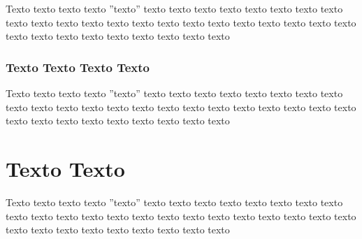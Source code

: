 Texto texto texto texto ''texto'' texto texto texto texto texto texto texto texto texto texto texto texto texto texto texto texto texto texto texto texto texto texto texto texto texto texto texto texto texto texto texto

\subsubsection{Texto Texto Texto Texto}
\label{subsub:outrasubsubsection2a}

Texto texto texto texto ''texto'' texto texto texto texto texto texto texto texto texto texto texto texto texto texto texto texto texto texto texto texto texto texto texto texto texto texto texto texto texto texto texto




\section{Texto Texto}
\label{sec:section3}

Texto texto texto texto ''texto'' texto texto texto texto texto texto texto texto texto texto texto texto texto texto texto texto texto texto texto texto texto texto texto texto texto texto texto texto texto texto texto